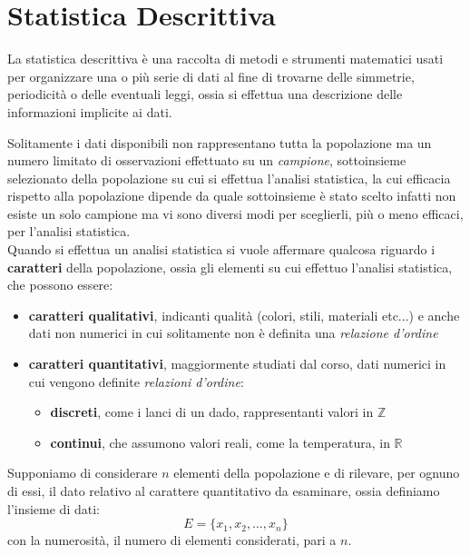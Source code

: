 \documentclass[a4paper,12pt, oneside]{book}
\newcommand{\numberset}{\mathbb}
\newcommand{\Z}{\numberset{Z}}
\newcommand{\R}{\numberset{R}}
\begin{document}
\chapter{Statistica Descrittiva}
La statistica descrittiva è una raccolta di metodi e strumenti matematici usati per organizzare una o più serie di dati
al fine di trovarne delle simmetrie, periodicità o delle eventuali leggi, ossia si effettua una descrizione 
delle informazioni implicite ai dati.

Solitamente i dati disponibili non rappresentano tutta la popolazione ma un numero limitato 
di osservazioni effettuato su un \emph{campione}, sottoinsieme selezionato della popolazione su cui si effettua
l'analisi statistica, la cui efficacia rispetto alla popolazione dipende da quale sottoinsieme è stato scelto
infatti non esiste un solo campione ma vi sono diversi modi per sceglierli, più o meno efficaci, per l'analisi statistica.
\\
Quando si effettua un analisi statistica si vuole affermare qualcosa riguardo i \textbf{caratteri} della popolazione,
ossia gli elementi su cui effettuo l'analisi statistica, che possono essere:
\begin{itemize}
    \item \textbf{caratteri qualitativi}, indicanti qualità (colori, stili, materiali etc...) e anche dati non numerici
             in cui solitamente non è definita una \textit{relazione d'ordine}
    \item \textbf{caratteri quantitativi}, maggiormente studiati dal corso, dati numerici in cui vengono definite \emph{relazioni d'ordine}:
        \begin{itemize}
            \item \textbf{discreti}, come i lanci di un dado, rappresentanti valori in $\Z$
            \item \textbf{continui}, che assumono valori reali, come la temperatura, in $\R$
        \end{itemize}
\end{itemize}
Supponiamo di considerare $n$ elementi della popolazione e di rilevare, per ognuno di essi,
il dato relativo al carattere quantitativo da esaminare, ossia definiamo l'insieme di dati:
\[ E=\{x_1, x_2, \dots, x_n\}\]
con la numerosità, il numero di elementi considerati, pari a $n$.
\end{document}
